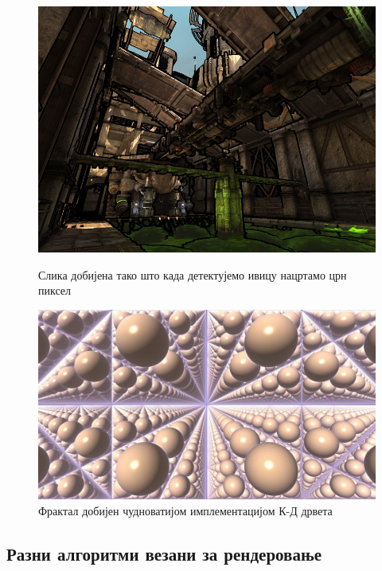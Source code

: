 \documentclass[12pt]{article}
\begin{document}
	\begin{figure}[H]
		\begin{minipage}{0.4\linewidth}
			\centering
			\includegraphics[max width=\linewidth]{slike/primerDetekcijeIvice.jpg}
			\caption{Слика добијена тако што када детектујемо ивицу нацртамо црн пиксел}
			\label{fig:detekcijaIvice}
		\end{minipage}\hfill
		\begin{minipage}{0.5\linewidth}
			\centering
			\includegraphics[max width=\linewidth]{slike/kdDrvoFraktali.jpg}
			\caption{Фрактал добијен чудноватијом имплементацијом К-Д дрвета}
			\label{fig:fraktali}
		\end{minipage}
	\end{figure}
	
	\subsection{Разни алгоритми везани за рендеровање}
	
\end{document}
